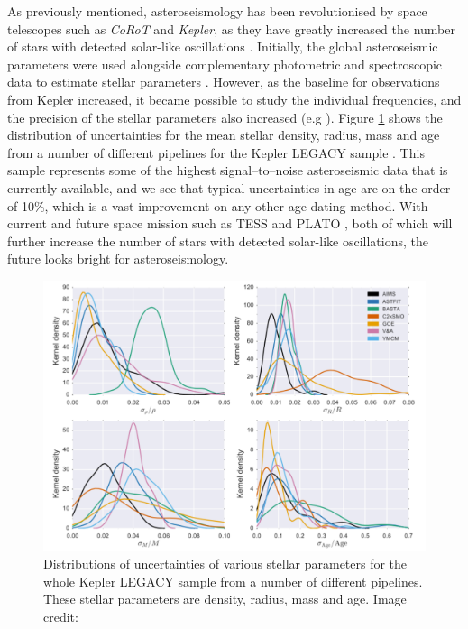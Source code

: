 As previously mentioned, asteroseismology has been revolutionised by space telescopes such as \textit{CoRoT} and \textit{Kepler}, as they have greatly increased the number of stars with detected solar-like oscillations \citep{Chaplin_etal_2011}. Initially, the global asteroseismic parameters were used alongside complementary photometric and spectroscopic data to estimate stellar parameters \citep{Chaplin_etal_2014}. However, as the baseline for observations from Kepler increased, it became possible to study the individual frequencies, and the precision of the stellar parameters also increased (e.g \citealt{Silva_Aguirre_etal_2015}). Figure \ref{fig:VSA_legacy_uncertainties} shows the distribution of uncertainties for the mean stellar density, radius, mass and age from a number of different pipelines for the Kepler LEGACY sample \citep{Lund_etal_2017}. This sample represents some of the highest signal--to--noise asteroseismic data that is currently available, and we see that typical uncertainties in age are on the order of 10\%, which is a vast improvement on any other age dating method. With current and future space mission such as TESS \citep{Ricker_etal_2015} and PLATO \citep{Rauer_etal_2014}, both of which will further increase the number of stars with detected solar-like oscillations, the future looks bright for asteroseismology.

\begin{figure}
    \centering
    \includegraphics[scale=0.4]{Figures/1-Introduction/silva_aguirre_2017_legacy.pdf}
    \caption[Distributions of uncertainties in asteroseismically determined parameters]{Distributions of uncertainties of various stellar parameters for the whole Kepler LEGACY sample from a number of different pipelines. These stellar parameters are density, radius, mass and age. Image credit: \citet{Silva_Aguirre_etal_2017}}
    \label{fig:VSA_legacy_uncertainties}
\end{figure}


